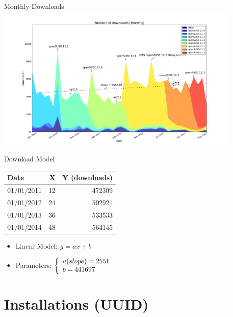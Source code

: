 \documentclass{beamer}
\begin{document}
\begin{frame}{Monthly Downloads}
  \includegraphics[height=7.2cm]{download_month}
\end{frame}

\begin{frame}{Download Model}
  \begin{center}
    \begin{tabular}{l r r}
      \toprule
      Date & X & Y (downloads) \\
      \midrule
      01/01/2011 & 12 & 472309 \\
      01/01/2012 & 24 & 502921 \\
      01/01/2013 & 36 & 533533 \\
      01/01/2014 & 48 & 564145 \\
      \bottomrule
    \end{tabular}
  \end{center}
  \begin{itemize}
  \item Linear Model: \(y = ax + b\)
  \item Parameters: \(\left\{
    \begin{array}{l l}
      a (slope) = 2551 \\
      b = 441697 \\
    \end{array} \right.\)
  \end{itemize}
\end{frame}


\section{Installations (UUID)}
\end{document}
